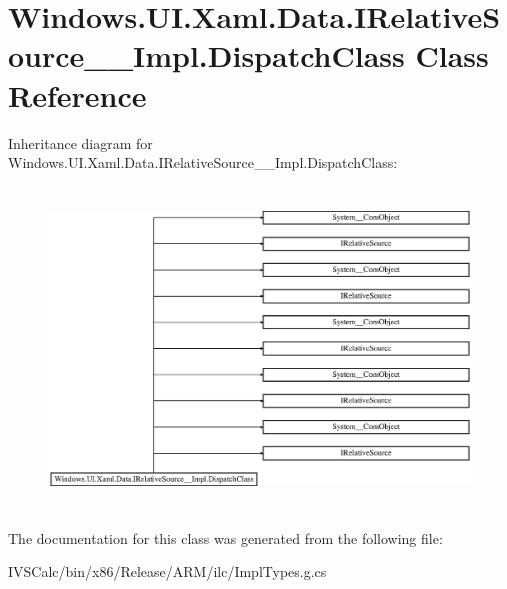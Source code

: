 \hypertarget{class_windows_1_1_u_i_1_1_xaml_1_1_data_1_1_i_relative_source_____impl_1_1_dispatch_class}{}\section{Windows.\+U\+I.\+Xaml.\+Data.\+I\+Relative\+Source\+\_\+\+\_\+\+Impl.\+Dispatch\+Class Class Reference}
\label{class_windows_1_1_u_i_1_1_xaml_1_1_data_1_1_i_relative_source_____impl_1_1_dispatch_class}
Inheritance diagram for Windows.\+U\+I.\+Xaml.\+Data.\+I\+Relative\+Source\+\_\+\+\_\+\+Impl.\+Dispatch\+Class\+:\begin{figure}[H]
\begin{center}
\leavevmode
\includegraphics[height=8.555555cm]{class_windows_1_1_u_i_1_1_xaml_1_1_data_1_1_i_relative_source_____impl_1_1_dispatch_class}
\end{center}
\end{figure}


The documentation for this class was generated from the following file\+:\begin{DoxyCompactItemize}
\item 
I\+V\+S\+Calc/bin/x86/\+Release/\+A\+R\+M/ilc/Impl\+Types.\+g.\+cs\end{DoxyCompactItemize}
